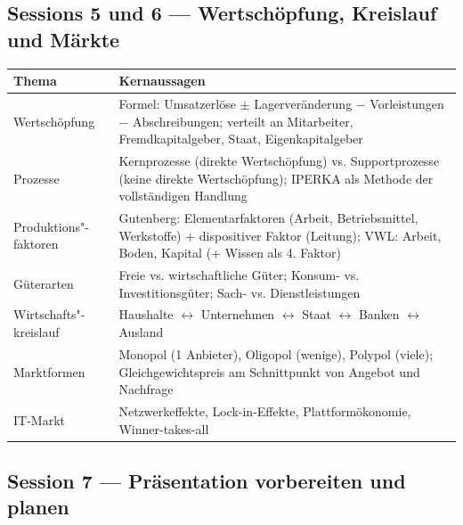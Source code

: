 \documentclass[11pt, a4paper]{article}
\begin{document}
\subsection{Sessions 5 und 6 --- Wertschöpfung, Kreislauf und Märkte}

\begin{center}
\begin{tabular}{p{3cm} p{10.5cm}}
\toprule
\textbf{Thema} & \textbf{Kernaussagen}\\
\midrule
Wertschöpfung & Formel: Umsatzerlöse $\pm$ Lagerveränderung $-$ Vorleistungen $-$ Abschreibungen;
                verteilt an Mitarbeiter, Fremdkapitalgeber, Staat, Eigenkapitalgeber\\
\addlinespace
Prozesse & Kernprozesse (direkte Wertschöpfung) vs. Supportprozesse (keine direkte Wertschöpfung);
           IPERKA als Methode der vollständigen Handlung\\
\addlinespace
Produktions"-faktoren & Gutenberg: Elementarfaktoren (Arbeit, Betriebsmittel, Werkstoffe)
                         + dispositiver Faktor (Leitung);
                         VWL: Arbeit, Boden, Kapital (+ Wissen als 4. Faktor)\\
\addlinespace
Güterarten & Freie vs. wirtschaftliche Güter; Konsum- vs. Investitionsgüter;
             Sach- vs. Dienstleistungen\\
\addlinespace
Wirtschafts"-kreislauf & Haushalte $\leftrightarrow$ Unternehmen $\leftrightarrow$ Staat
                          $\leftrightarrow$ Banken $\leftrightarrow$ Ausland\\
\addlinespace
Marktformen & Monopol (1 Anbieter), Oligopol (wenige), Polypol (viele);
              Gleichgewichtspreis am Schnittpunkt von Angebot und Nachfrage\\
\addlinespace
IT-Markt & Netzwerkeffekte, Lock-in-Effekte, Plattformökonomie, Winner-takes-all\\
\bottomrule
\end{tabular}
\end{center}

\subsection{Session 7 --- Präsentation vorbereiten und planen}
\end{document}
